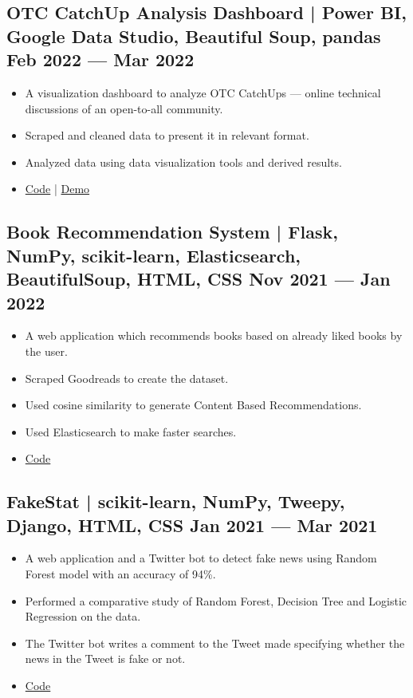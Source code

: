\documentclass[10pt]{article}
\newenvironment{zitemize}{
\begin{itemize}\itemsep2pt \parskip0pt \parsep1pt}
{\end{itemize}\vspace{-0.7cm}}
\begin{document}
\subsection*{OTC CatchUp Analysis Dashboard | Power BI, Google Data Studio, Beautiful Soup, pandas \hfill 
Feb 2022 --- Mar 2022}
    \begin{zitemize}
    \item A visualization dashboard to analyze OTC CatchUps --- online technical discussions of an open-to-all community.
     \item Scraped and cleaned data to present it in relevant format.
        \item Analyzed data using data visualization tools and derived results.
       \item \href{https://github.com/mihikagaonkar/OTC-Dashboard/}{Code}
| \href{https://mihikagaonkar.github.io/OTC-Dashboard/data_studio}{Demo}
    \end{zitemize}
\subsection*{Book Recommendation System | Flask, NumPy, scikit-learn, Elasticsearch, BeautifulSoup, HTML, CSS  \hfill Nov 2021 --- Jan 2022
}
    \begin{zitemize}
    \item A web application which recommends books based on already liked books by the user.
     \item Scraped  Goodreads to create the dataset.
        \item Used cosine similarity to generate Content Based Recommendations.
        \item Used Elasticsearch to make faster searches.
       \item \href{https://github.com/mihikagaonkar/book-recommender-system}{Code}
    \end{zitemize}
\subsection*{FakeStat | scikit-learn, NumPy, Tweepy, Django, HTML, CSS \hfill Jan 2021 --- Mar 2021} 
    \begin{zitemize}
        \item A web application and a Twitter bot to detect fake news using Random Forest model with an accuracy of 94\%.
        \item Performed a comparative study of Random Forest, Decision Tree and Logistic Regression on the data.
        \item The Twitter bot writes a comment to the Tweet made specifying whether the news in the Tweet is fake or not.
        
        \item \href{https://github.com/mihikagaonkar/FakeStat}{Code}
    \end{zitemize}
\end{document}
